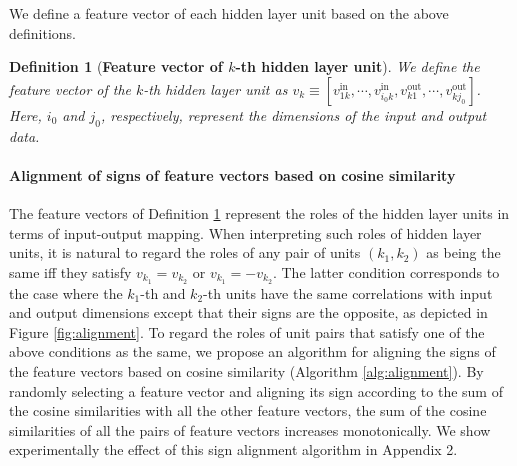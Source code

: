 \documentclass{article}
\newtheorem{definition}{Definition}
\begin{document}
We define a feature vector of each hidden layer unit based on the above definitions. 
\begin{definition}[\textbf{Feature vector of $k$-th hidden layer unit}]
We define the feature vector of the $k$-th hidden layer unit as $v_k\equiv [v^{\mathrm{in}}_{1k}, \cdots , v^{\mathrm{in}}_{i_0 k}, v^{\mathrm{out}}_{k1}, \cdots , v^{\mathrm{out}}_{kj_0}]$. 
Here, $i_0$ and $j_0$, respectively, represent the dimensions of the input and output data. 
\label{def:feature}
\end{definition}

\paragraph{Alignment of signs of feature vectors based on cosine similarity}
The feature vectors of Definition \ref{def:feature} represent the roles of the hidden layer units in terms of input-output mapping. When interpreting such roles of hidden layer units, it is natural to regard the roles of any pair of units $(k_1, k_2)$ as being the same iff they satisfy $v_{k_1}=v_{k_2}$ or $v_{k_1}=-v_{k_2}$. The latter condition corresponds to the case where the $k_1$-th and $k_2$-th units have the same correlations with input and output dimensions except that their signs are the opposite, as depicted in Figure \ref{fig:alignment}. 
To regard the roles of unit pairs that satisfy one of the above conditions as the same, we propose an algorithm for aligning the signs of the feature vectors based on cosine similarity (Algorithm \ref{alg:alignment}). By randomly selecting a feature vector and aligning its sign according to the sum of the cosine similarities with all the other feature vectors, the sum of the cosine similarities of all the pairs of feature vectors increases monotonically. 
We show experimentally the effect of this sign alignment algorithm in Appendix 2. 
\end{document}

